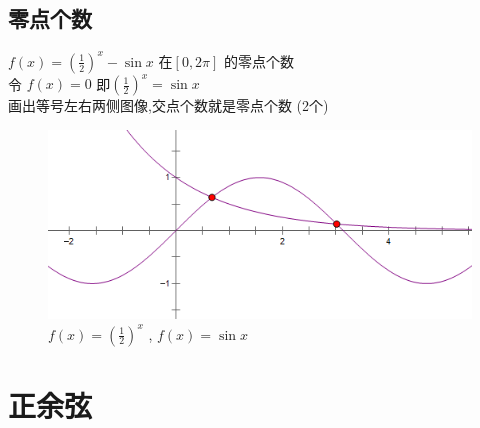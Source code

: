 \documentclass[hyperref, UTF8,11pt,a4paper]{ctexart} %
\begin{document}
\subsection {零点个数}
{\color{red}  $f(x)=\left(\frac{1}{2}\right)^{x}-\sin x$ 在$[0,2\pi]$ 的零点个数} \\
令 $f(x)=0$ 即$\left(\frac{1}{2}\right)^{x}=\sin x$ \\
画出等号左右两侧图像,交点个数就是零点个数 (2个)
\begin{figure}[h] %
	\begin{center}
		\includegraphics[scale=0.5]  {pic/sanjiaohanshu/lingdiangeshu.png}
		\caption{$f(x)=\left(\frac{1}{2}\right)^{x}$ , $f(x)=\sin x$}
	\end{center}
\end{figure}

\newpage
\section{正余弦}
\end{document}

